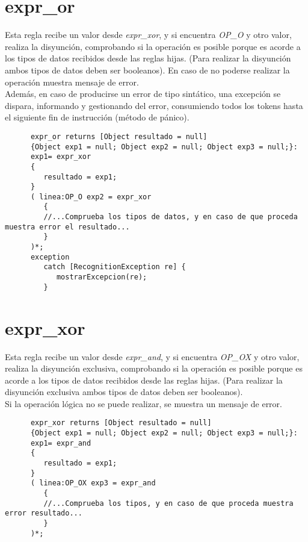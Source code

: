    \section{expr\_or}
   Esta regla recibe un valor desde \textit{expr\_xor}, y si encuentra \textit{OP\_O} y otro valor, realiza la disyunción, 
   comprobando si la operación es posible porque es acorde a los tipos de datos recibidos desde las reglas hijas. (Para realizar
   la disyunción ambos tipos de datos deben ser booleanos). En caso de no poderse realizar la operación muestra mensaje de error.\\

   Además, en caso de producirse un error de tipo sintático, una excepción se dispara, informando y gestionando del error, 
   consumiendo todos los tokens hasta el siguiente fin de instrucción (método de pánico).\\
   \begin{lstlisting}
      expr_or returns [Object resultado = null] 
      {Object exp1 = null; Object exp2 = null; Object exp3 = null;}: 
      exp1= expr_xor
      {
         resultado = exp1;
      }
      ( linea:OP_O exp2 = expr_xor
         {
         //...Comprueba los tipos de datos, y en caso de que proceda muestra error el resultado...
         } 
      )*;
      exception
         catch [RecognitionException re] {
            mostrarExcepcion(re);
         }
   \end{lstlisting}

   \section{expr\_xor}
   Esta regla recibe un valor desde \textit{expr\_and}, y si encuentra \textit{OP\_OX} y otro valor, realiza la disyunción 
   exclusiva, comprobando si la operación es posible porque es acorde a los tipos de datos recibidos desde las reglas hijas. 
   (Para realizar la disyunción exclusiva ambos tipos de datos deben ser booleanos).\\
  
   Si la operación lógica no se puede realizar, se muestra un mensaje de error.
   \begin{lstlisting}
      expr_xor returns [Object resultado = null]
      {Object exp1 = null; Object exp2 = null; Object exp3 = null;}: 
      exp1= expr_and
      {
         resultado = exp1;
      }
      ( linea:OP_OX exp3 = expr_and
         {
         //...Comprueba los tipos, y en caso de que proceda muestra error resultado...
         } 
      )*;
   \end{lstlisting}

